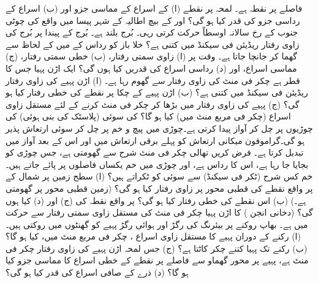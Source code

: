   فاصلے پر  نقطہ ہے۔ لمحہ  پر  نقطے  (ا) کے اسراع کے مماسی جزو  اور (ب) اسراع کے رداسی جزو کی قدر کیا ہو گی؟
 اور  کے بیچ  اطالیہ   کے شہر  پیسا  میں واقع   کی چوٹی    جنوب کے رخ سالانہ  اوسطاً    حرکت کرتی رہی۔ بُرج  بلند ہے۔ بُرج کے پیندا پر  بُرج کی زاوی رفتار ریڈیئن فی سیکنڈ میں  کتنی  ہے؟ 
خلا باز  کو   رداس کے   میں  کے لحاظ سے گھما کر  جانچا جاتا ہے۔ وقت  پر (ا) زاوی سمتی رفتار، (ب) خطی سمتی رفتار، (ج) مماسی اسراع، اور (د) رداسی اسراع کی قدریں کیا ہوں گی؟
ایک اڑن پہیا جس کا قطر  ہے  چکر فی منٹ کی زاوی رفتار سے گھوم رہا ہے۔ (ا)  اڑن پہیے کی زاوی رفتار ریڈیئن فی سیکنڈ میں کتنی ہے؟ (ب) اڑن پہیے کے چکا پر نقطے کی خطی رفتار کیا ہو گی؟ (ج)  پہیے کی زاوی رفتار  میں بڑھا کر    چکر فی منٹ   کرنے کے لئے مستقل زاوی اسراع (چکر فی مربع  منٹ میں) کیا ہو گا؟
 کی سوئی    (پلاسٹک کی بنی ہوئی)  کی چوڑیوں  پر چل کر آواز پیدا کرتی ہے۔چوڑی میں  پیچ و خم  پر چل کر سوئی ارتعاش پذیر ہو گی۔گراموفون  میکانی  ارتعاش کو   پہلے     برقی ارتعاش میں اور اس کے بعد  آواز میں تبدیل کرتا ہے۔ فرض کریں تھالی  چکر فی منٹ  شرح سے گھومتی ہے، جس چوڑی کو بجایا جا رہا ہے، اس کا رداس  ہے، اور  چوڑی میں خم یکساں  فاصلوں پر پائے جاتے ہیں۔ خم کس شرح  (ٹکر فی سیکنڈ) سے سوئی کو ٹکراتے ہیں؟
(ا) سطح زمین پر     شمال کے  پر  واقع نقطے  کی  قطبی محور پر زاوی رفتار  کیا ہو گی؟ (زمین قطبی محور پر گھومتی ہے۔) (ب)   اس نقطے کی خطی رفتار  کیا ہو گی؟ پر واقع  نقطہ کی (ج)  اور (د)  کیا ہوں گی؟
 (دخانی انجن  ) کا اڑن پہیا   چکر فی منٹ کی مستقل زاوی سمتی رفتار سے حرکت میں ہے۔ بھاپ  روکنے  پر بیئرنگ کی   رگڑ اور ہوائی رگڑ پہیے کو   گھنٹوں میں روکتی ہیں۔ (ا)  رکنے کے دوران پہیے کا مستقل زاوی اسراع ، چکر فی مربع منٹ میں، کیا ہو گا؟ (ب)  رکنے تک پہیا کتنے چکر کاٹتا ہے؟ (ج)  جس لمحہ اڑن پہیے کی زاوی رفتار  چکر فی منٹ ہے، پہیے پر  محور گھماو سے  فاصلے پر نقطے  کے خطی  اسراع کا مماسی جزو  کیا ہو گا؟ (د)  ذرے کے صافی اسراع کی قدر کیا ہو گی؟
